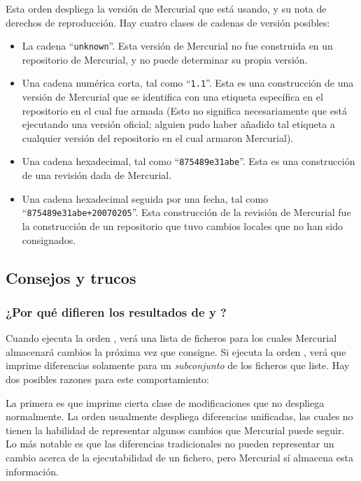

Esta orden despliega la versión de Mercurial que está usando, y su
nota de derechos de reproducción.  Hay cuatro clases de cadenas de
versión posibles:
\begin{itemize}
\item La cadena ``\texttt{unknown}''. Esta versión de Mercurial no fue
  construida en un repositorio de Mercurial, y no puede determinar su
  propia versión.
\item Una cadena numérica corta, tal como ``\texttt{1.1}''. Esta es
  una construcción de una versión de Mercurial que se identifica con
  una etiqueta específica en el repositorio en el cual fue
  armada (Esto no significa necesariamente que está ejecutando una
  versión oficial; alguien pudo haber añadido tal etiqueta a cualquier
  versión del repositorio en el cual armaron Mercurial).
\item Una cadena hexadecimal, tal como ``\texttt{875489e31abe}''.
  Esta es una construcción de una revisión dada de Mercurial.
\item Una cadena hexadecimal seguida por una fecha, tal como
  ``\texttt{875489e31abe+20070205}''.  Esta construcción de la
  revisión de Mercurial fue la construcción de un repositorio que tuvo
  cambios locales que no han sido consignados.
\end{itemize}

\subsection{Consejos y trucos}

\subsubsection{¿Por qué difieren los resultados de  y
  ?}
\label{cmdref:diff-vs-status}

Cuando ejecuta la orden , verá una lista de ficheros
para los cuales Mercurial almacenará cambios la próxima vez que
consigne.  Si ejecuta la orden , verá que imprime
diferencias solamente para un \emph{subconjunto} de los ficheros que
 liste.  Hay dos posibles razones para este comportamiento:

La primera es que  imprime cierta clase de
modificaciones que  no despliega normalmente.  La orden
 usualmente despliega diferencias unificadas, las cuales
no tienen la habilidad de representar algunos cambios que Mercurial
puede seguir.  Lo más notable es que las diferencias tradicionales no
pueden representar un cambio acerca de la ejecutabilidad de un
fichero, pero Mercurial sí almacena esta información.

